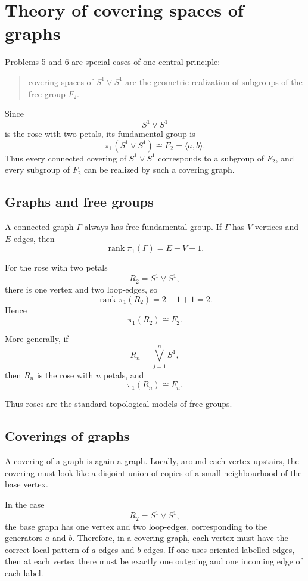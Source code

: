 \documentclass[12pt,a4paper]{article}
\theoremstyle{notespace}
\begin{document}
\section{Theory of covering spaces of graphs}

Problems 5 and 6 are special cases of one central principle:
\begin{quote}
	covering spaces of \(S^1\vee S^1\) are the geometric realization of subgroups of the free group \(F_2\).
\end{quote}
Since
\[
S^1\vee S^1
\]
is the rose with two petals, its fundamental group is
\[
\pi_1(S^1\vee S^1)\cong F_2=\langle a,b\rangle.
\]
Thus every connected covering of \(S^1\vee S^1\) corresponds to a subgroup of \(F_2\), and every subgroup of \(F_2\) can be realized by such a covering graph.

\bigskip

\subsection{Graphs and free groups}

A connected graph \(\Gamma\) always has free fundamental group. If \(\Gamma\) has \(V\) vertices and \(E\) edges, then
\[
\operatorname{rank}\pi_1(\Gamma)=E-V+1.
\]

For the rose with two petals
\[
R_2=S^1\vee S^1,
\]
there is one vertex and two loop-edges, so
\[
\operatorname{rank}\pi_1(R_2)=2-1+1=2.
\]
Hence
\[
\pi_1(R_2)\cong F_2.
\]

More generally, if
\[
R_n=\bigvee_{j=1}^n S^1,
\]
then \(R_n\) is the rose with \(n\) petals, and
\[
\pi_1(R_n)\cong F_n.
\]

Thus roses are the standard topological models of free groups.

\bigskip

\subsection{Coverings of graphs}

A covering of a graph is again a graph. Locally, around each vertex upstairs, the covering must look like a disjoint union of copies of a small neighbourhood of the base vertex.

In the case
\[
R_2=S^1\vee S^1,
\]
the base graph has one vertex and two loop-edges, corresponding to the generators \(a\) and \(b\). Therefore, in a covering graph, each vertex must have the correct local pattern of \(a\)-edges and \(b\)-edges. If one uses oriented labelled edges, then at each vertex there must be exactly one outgoing and one incoming edge of each label.
\end{document}

